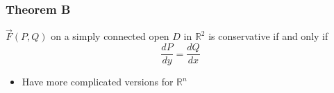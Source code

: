     \subsubsection{Theorem B}

      $ \vec{F}\left( P, Q \right) $ on a simply connected open $ D $
      in $ \mathbb{R}^{2} $ is conservative if and only if
      \begin{equation}
        \frac{dP}{dy} = \frac{dQ}{dx}
      \end{equation}

      \begin{itemize}
        \item Have more complicated versions for $ \mathbb{R}^{n} $
      \end{itemize}
